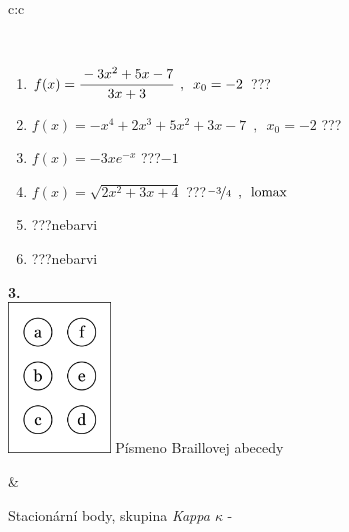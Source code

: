 \documentclass[10pt]{report}
\begin{document}
\begin{tabular}{c:c}
\begin{minipage}[c][104.5mm][t]{0.5\linewidth}
\begin{center}
\begin{minipage}{0.95\linewidth}
\begin{center}
\end{center}
\end{minipage}
\\[1mm]
\begin{minipage}{0.79\linewidth}
\begin{center}
\begin{varwidth}{\linewidth}
\begin{enumerate}
\normalsize
\item $f(x)=\cfrac{-3x^2+5x-7}{3x+3}\enspace , \enspace x_0=-2$\quad \dotfill\; ???\;\dotfill \quad {}
\item $f(x)=-x^4+2x^3+5x^2+3x-7\enspace , \enspace x_0=-2$\quad \dotfill\; ???\;\dotfill \quad {}
\item $f(x)=-3xe^{-x}$\quad \dotfill\; ???\;\dotfill \quad $-1$
\item $f(x)=\sqrt{2x^2+3x+4}$\quad \dotfill\; ???\;\dotfill \quad $\nicefrac{-3}{4}\enspace , \enspace\mathrm{lomax}$
\item \quad \dotfill\; ???\;\dotfill \quad nebarvi
\item \quad \dotfill\; ???\;\dotfill \quad nebarvi
\end{enumerate}
\end{varwidth}
\end{center}
\end{minipage}
\begin{minipage}{0.20\linewidth}
\begin{center}
{\Huge\bfseries 3.} \\[2mm]
\includegraphics[height=40mm]{../images/braille.png}
{\small Písmeno Braillovej abecedy}
\end{center}
\end{minipage}
\end{center}
\end{minipage}
&
\begin{minipage}[c][104.5mm][t]{0.5\linewidth}
\begin{center}
\vspace{7mm}
{\huge Stacionární body, skupina \textit{Kappa $\kappa$} -}\\[5mm]

\end{center}
\end{minipage}
\end{tabular}
\end{document}
